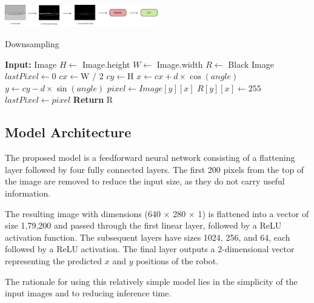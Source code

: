 \documentclass[a4paper]{article}
\begin{document}
\begin{multicols}{2}
\par \noindent


\includegraphics[width=0.5\textwidth]{../results/Flowchart.png} %
\begin{algorithm}[H]
  \caption{Downsampling}
\begin{algorithmic}[1]
\Statex \textbf{Input: }Image
\State $H \gets$ Image.height
\State $W \gets$ Image.width
\State $R \gets$ Black Image
    \State $lastPixel \gets 0$
    \State $cx \gets \text{W / 2}$
    \State $cy \gets \text{H}$
        \State $x \gets cx + d \times \cos(angle)$
        \State $y \gets cy - d \times \sin(angle)$
          \State $pixel \gets Image[y][x]$
            \State $R[y][x] \gets 255 $ 
          \EndIf
          \State $lastPixel \gets pixel$
        \EndIf
    \EndFor
\EndFor
\State \textbf{Return} R
\end{algorithmic}
\end{algorithm}

\subsection{Model Architecture}
\par \noindent
The proposed model is a feedforward neural network consisting of a flattening layer followed 
by four fully connected layers. The first 200 pixels from the top of the image are removed 
to reduce the input size, as they do not carry useful information.

\par \noindent
The resulting image with dimensions (640 $\times$ 280 $\times$ 1) is flattened into a vector 
of size 1,79,200 and passed through the first linear layer, followed by a ReLU activation function.
The subsequent layers have sizes 1024, 256, and 64, each followed by a ReLU activation. 
The final layer outputs a 2-dimensional vector representing the predicted $x$ and $y$ positions of the robot.

\par \noindent
The rationale for using this relatively simple model lies in the simplicity of the input images 
and to reducing inference time.


\end{multicols}
\end{document}
